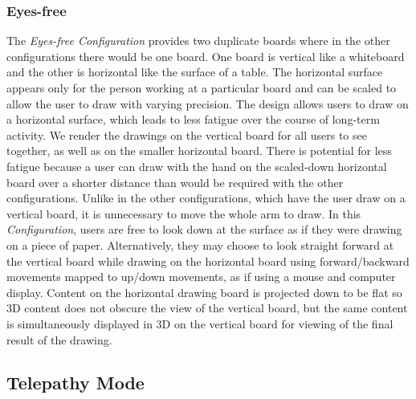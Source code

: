 \documentclass[chi_draft]{sigchi}
\begin{document}
\subsubsection{Eyes-free}
The \textit{Eyes-free Configuration} provides two duplicate boards where in the other configurations there would be one board. One board is vertical like a whiteboard and the other is horizontal like the surface of a table. The horizontal surface appears only for the person working at a particular board and can be scaled to allow the user to draw with varying precision. %
The design allows users to draw on a horizontal surface, which leads to less fatigue over the course of long-term activity. We render the drawings on the vertical board for all users to see together, as well as on the smaller horizontal board. There is potential for less fatigue because a user can draw with the hand on the scaled-down horizontal board over a shorter distance than would be required with the other configurations. Unlike in the other configurations, which have the user draw on a vertical board, it is unnecessary to move the whole arm to draw. In this \textit{Configuration}, users are free to look down at the surface as if they were drawing on a piece of paper. Alternatively, they may choose to look straight forward at the vertical board while drawing on the horizontal board using forward/backward movements mapped to up/down movements, as if using a mouse and computer display. Content on the horizontal drawing board is projected down to be flat so 3D content does not obscure the view of the vertical board, but the same content is simultaneously displayed in 3D on the vertical board for viewing of the final result of the drawing. 
\subsection{Telepathy Mode}
\end{document}
